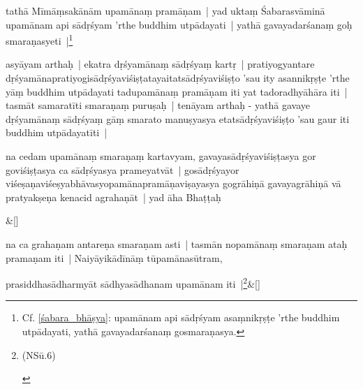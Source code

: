 \documentclass[article,a4paper]{memoir}
\newcommand{\name}[1]{#1}
\newcommand{\persName}[1]{#1}
\begin{document}
	  \pstart tathā\- \name{Mī\-mā\-ṃsakā\-nā\-m} upamā\-naṃ pramā\-ṇam | yad uktaṃ \persName{Śabarasvā\-minā\-} \label{kāśikā1_start}upamā\-nam api sā\-dṛśyam  'rthe buddhim utpā\-dayati | yathā\- gavayadarśanaṃ goḥ smaraṇasyeti |\footnote{Cf. \cref{śabara_bhāṣya}: upamā\-nam api sā\-dṛśyam asaṃnikṛṣṭe 'rthe buddhim utpā\-dayati, yathā\- gavayadarśanaṃ gosmaraṇasya.}
	\pend
      

	  \pstart asyā\-yam arthaḥ | ekatra dṛśyamā\-naṃ sā\-dṛśyaṃ kartṛ | pratiyogyantare dṛśyamā\-napratiyogisā\-dṛśyaviśiṣṭatayaitatsā\-dṛśyaviśiṣṭo 'sau ity asannikṛṣṭe 'rthe yā\-ṃ buddhim utpā\-dayati tadupamā\-naṃ pramā\-ṇam iti yat tadoradhyā\-hā\-ra iti |\label{kāśikā1_end} tasmā\-t samaratī\-ti smaraṇaṃ puruṣaḥ | tenā\-yam arthaḥ - yathā\- gavaye dṛśyamā\-naṃ sā\-dṛśyaṃ gā\-ṃ smarato manuṣyasya etatsā\-dṛśyaviśiṣṭo 'sau gaur iti buddhim utpā\-dayatī\-ti |
	\pend
      

	  \pstart na cedam upamā\-naṃ smaraṇaṃ kartavyam, gavayasā\-dṛśyaviśiṣṭasya gor goviśiṣṭasya ca sā\-dṛśyasya prameyatvā\-t | gosā\-dṛśyayor viśeṣaṇaviśeṣyabhā\-vasyopamā\-napramā\-ṇaviṣayasya gogrā\-hiṇā\- gavayagrā\-hiṇā\- vā\- pratyakṣeṇa kenacid agrahaṇā\-t | yad ā\-ha Bhaṭṭaḥ
	\pend
      
	    
	    \stanza[\smallbreak]
\&[\smallbreak]


	

	  \pstart na ca grahaṇam antareṇa smaraṇam asti | tasmā\-n nopamā\-naṃ smaraṇam ataḥ pramaṇam iti | Naiyā\-yikā\-dī\-nā\-ṃ tū\-pamā\-nasū\-tram,
	\pend
      
	    
	    \stanza[\smallbreak]
prasiddhasā\-dharmyā\-t sā\-dhyasā\-dhanam upamā\-nam iti |\footnote{\begin{english}(NSū.6)\end{english}}\&[\smallbreak]
\end{document}
